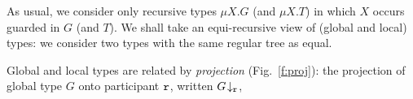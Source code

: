 \documentclass[runningheads]{llncs}
\begin{document}
As usual, we consider only recursive types $\mu X. G$ (and $\mu X. T$) in which $X$ occurs guarded in $G$ (and $T$).
 We shall take an equi-recursive view of (global and local) types: we consider two  types with the same regular tree as equal.
 
Global and local types are related by  \emph{projection} (Fig.~\ref{f:proj}):
the projection of global type $G$ onto participant $\mathtt{r}$, written $G\!\downarrow_{\mathtt{r}}$,
\end{document}
